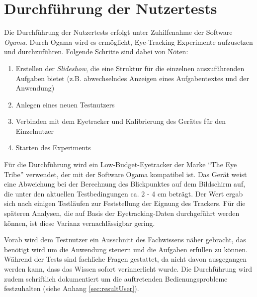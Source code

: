 \section{Durchführung der Nutzertests} \label{sec:testExecution}
Die Durchführung der Nutzertests erfolgt unter Zuhilfenahme der Software \textit{Ogama}. Durch Ogama wird es ermöglicht, Eye-Tracking Experimente aufzusetzen und durchzuführen. Folgende Schritte sind dabei von Nöten:\par
\begin{enumerate}
 \item Erstellen der \textit{Slideshow}, die eine Struktur für die einzelnen auszuführenden Aufgaben bietet (z.B. abwechselndes Anzeigen eines Aufgabentextes und der Anwendung)
 \item Anlegen eines neuen Testnutzers
 \item Verbinden mit dem Eyetracker und Kalibrierung des Gerätes für den Einzelnutzer
 \item Starten des Experiments
\end{enumerate}
Für die Durchführung wird ein Low-Budget-Eyetracker der Marke \enquote{The Eye Tribe} verwendet, der mit der Software Ogama kompatibel ist. Das Gerät weist eine Abweichung bei der Berechnung des Blickpunktes auf dem Bildschirm auf, die unter den aktuellen Testbedingungen ca. 2 - 4 cm beträgt. Der Wert ergab sich nach einigen Testläufen zur Feststellung der Eignung des Trackers. Für die späteren Analysen, die auf Basis der Eyetracking-Daten durchgeführt werden können, ist diese Varianz vernachlässigbar gering.\par
Vorab wird dem Testnutzer ein Ausschnitt des Fachwissens näher gebracht, das benötigt wird um die Anwendung steuern und die Aufgaben erfüllen zu können. Während der Tests sind fachliche Fragen gestattet, da nicht davon ausgegangen werden kann, dass das Wissen sofort verinnerlicht wurde. Die Durchführung wird zudem schriftlich dokumentiert um die auftretenden Bedienungsprobleme festzuhalten (siehe Anhang \ref{sec:resultUser}).\par
